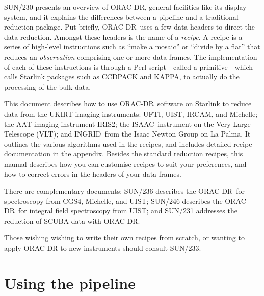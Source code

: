 \documentclass[twoside,11pt]{article}
\newcommand{\htmladdnormallink}[2]{#1}
\newcommand{\xref}[3]{#1}
\newcommand{\xlabel}[1]{}
\renewcommand{\_}{\texttt{\symbol{95}}}
\newcommand{\CCDPACK}{{\footnotesize CCDPACK}}
\newcommand{\KAPPA}{{\footnotesize KAPPA}}
\newcommand{\ORACDR}{{\footnotesize ORAC-DR}}
\newcommand{\VLT}{\htmladdnormallink{VLT}{http://www.eso.org/instruments/}}
\newcommand{\INGRID}{\htmladdnormallink{INGRID}{http://www.ing.iac.es/Astronomy/instruments/ingrid/}}
\newcommand{\IRCAM}{\htmladdnormallink{IRCAM}{http://www.jach.hawaii.edu/JACpublic/UKIRT/instruments/ircam/ircam3.html}}
\newcommand{\IRIS}{\htmladdnormallink{IRIS2}{http://www.aao.gov.au/iris2/}}
\newcommand{\ISAAC}{\htmladdnormallink{ISAAC}{http://www.eso.org/instruments/isaac/}}
\newcommand{\Michelle}{\htmladdnormallink{Michelle}{http://www.jach.hawaii.edu/JACpublic/UKIRT/instruments/michelle/michelle.html}}
\newcommand{\UIST}{\htmladdnormallink{UIST}{http://www.jach.hawaii.edu/JACpublic/UKIRT/instruments/uist/uist.html}}
\newcommand{\UFTI}{\htmladdnormallink{UFTI}{http://www.jach.hawaii.edu/JACpublic/UKIRT/instruments/ufti/ufti.html}}
\begin{document}
\xref{SUN/230}{sun230}{} presents an overview of \ORACDR,
general facilities like its display system, and it explains the
differences between a pipeline and a traditional reduction package.
Put briefly, \ORACDR\ uses a few data headers to direct the data
reduction.  Amongst these headers is the name of a {\em recipe}.  A
recipe is a series of high-level instructions such as ``make a
mosaic'' or ``divide by a flat'' that reduces an {\em observation\/}
comprising one or more data frames.  The implementation of each of
these instructions is through a Perl script---called a
primitive---which calls Starlink packages such as
\xref{\CCDPACK}{sun139}{} and \xref{\KAPPA}{sun95}{},
to actually do the processing of the bulk data.

This document describes how to use \ORACDR\ software on Starlink to
reduce data from the UKIRT imaging instruments: \UFTI, \UIST, \IRCAM, and
\Michelle; the AAT imaging instrument \IRIS; the \ISAAC\ instrument on the
Very Large Telescope (\VLT); and \INGRID\ from the Isaac Newton Group on La Palma.
It outlines the various algorithms used in the recipes, and
includes detailed recipe documentation in the appendix.  Besides the
standard reduction recipes, this manual describes how you can
customise recipes to suit your preferences, and how to correct errors
in the headers of your data frames.

There are complementary documents: \xref{SUN/236}{sun236}{} describes the
\ORACDR\ for spectroscopy from CGS4, Michelle, and UIST; \xref{SUN/246}{sun246}{}
describes the \ORACDR\ for integral field spectroscopy from UIST;
and \xref{SUN/231}{sun231}{} addresses the reduction of SCUBA data with \ORACDR.



Those wishing wishing to write their own recipes from scratch, or wanting
to apply ORAC-DR to new instruments should consult \xref{SUN/233}{sun233}{}.

\section{\xlabel{using_the_pipeline}Using the pipeline\label{using_the_pipeline}}
\end{document}
